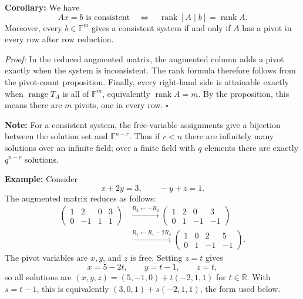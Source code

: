 \documentclass[a4paper,11pt,abstract=true]{scrartcl}
\theoremstyle{dotlessP}
\theoremstyle{dotlessS}
\theoremstyle{remark}
\theoremstyle{definition}
\begin{document}
\begin{problem_box}
\textbf{Corollary:} We have
\[
Ax=b\text{ is consistent}
\quad\Longleftrightarrow\quad
\operatorname{rank}[A\mid b]=\operatorname{rank}A.
\]
Moreover, every $b\in\mathbb{F}^m$ gives a consistent system if and
only if $A$ has a pivot in every row after row reduction.

\end{problem_box}

\begin{claim_box}
\textit{Proof:} In the reduced augmented matrix, the augmented column
adds a pivot exactly when the system is inconsistent. The rank formula
therefore follows from the pivot-count proposition. Finally, every
right-hand side is attainable exactly when $\operatorname{range}T_A$
is all of $\mathbb{F}^m$, equivalently $\operatorname{rank}A=m$.
By the proposition, this means there are $m$ pivots, one in every row.
\hfill$\square$
\end{claim_box}

\begin{remark_box}
\textbf{Note:} For a consistent system,
the free-variable assignments give a bijection between the solution
set and $\mathbb{F}^{n-r}$. Thus if $r<n$ there are infinitely many
solutions over an infinite field; over a finite field with $q$ elements
there are exactly $q^{n-r}$ solutions.
\end{remark_box}

\begin{example_box}
\textbf{Example:} Consider
\[ 
x+2y=3,\qquad -y+z=1.
\]
The augmented matrix reduces as follows:
\[
\begin{aligned}
\left(\begin{array}{ccc|c}1&2&0&3\\0&-1&1&1\end{array}\right)
&\xrightarrow{R_2\leftarrow -R_2}
\left(\begin{array}{ccc|c}1&2&0&3\\0&1&-1&-1\end{array}\right)\\[4pt]
&\xrightarrow{R_1\leftarrow R_1-2R_2}
\left(\begin{array}{ccc|c}1&0&2&5\\0&1&-1&-1\end{array}\right).
\end{aligned}
\]
The pivot variables are $x,y$, and $z$ is free. Setting $z=t$ gives
\[
x=5-2t,\qquad y=t-1,\qquad z=t,
\]
so all solutions are
$(x,y,z)=(5,-1,0)+t(-2,1,1)$ for $t\in\mathbb{R}$.
With $s=t-1$, this is equivalently
$(3,0,1)+s(-2,1,1)$, the form used below.
\end{example_box}
\end{document}
